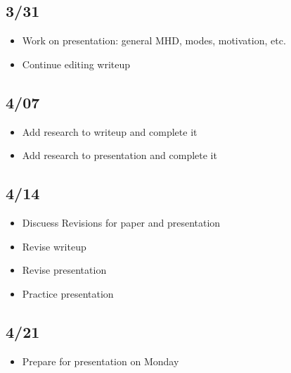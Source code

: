 \documentclass[12pt]{article}
\begin{document}
\subsection*{3/31}
\begin{itemize}
    \item Work on presentation: general MHD, modes, motivation, etc.
    \item Continue editing writeup
\end{itemize}

\subsection*{4/07}
\begin{itemize}
    \item Add research to writeup and complete it
    \item Add research to presentation and complete it
\end{itemize}

\subsection*{4/14}
\begin{itemize}
    \item Discuess Revisions for paper and presentation
    \item Revise writeup
    \item Revise presentation
    \item Practice presentation
\end{itemize}

\subsection*{4/21}
\begin{itemize}
    \item Prepare for presentation on Monday
\end{itemize}
\end{document}
